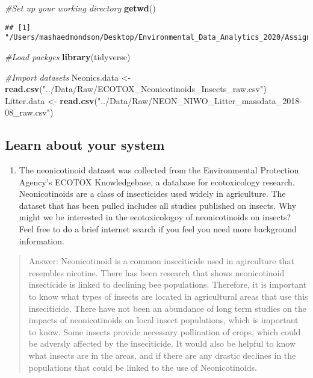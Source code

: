 \documentclass[]{article}
\newenvironment{Shaded}{\begin{snugshade}}{\end{snugshade}}
\newcommand{\CommentTok}[1]{\textcolor[rgb]{0.56,0.35,0.01}{\textit{#1}}}
\newcommand{\KeywordTok}[1]{\textcolor[rgb]{0.13,0.29,0.53}{\textbf{#1}}}
\newcommand{\NormalTok}[1]{#1}
\newcommand{\StringTok}[1]{\textcolor[rgb]{0.31,0.60,0.02}{#1}}
\providecommand{\tightlist}{%
  \setlength{\itemsep}{0pt}\setlength{\parskip}{0pt}}
\begin{document}
\begin{Shaded}
\begin{Highlighting}[]
\CommentTok{#Set up your working directory}
\KeywordTok{getwd}\NormalTok{()}
\end{Highlighting}
\end{Shaded}

\begin{verbatim}
## [1] "/Users/mashaedmondson/Desktop/Environmental_Data_Analytics_2020/Assignments"
\end{verbatim}

\begin{Shaded}
\begin{Highlighting}[]
\CommentTok{#Load packges}
\KeywordTok{library}\NormalTok{(tidyverse)}

\CommentTok{#Import datasets}
\NormalTok{Neonics.data <-}\StringTok{ }\KeywordTok{read.csv}\NormalTok{(}\StringTok{"../Data/Raw/ECOTOX_Neonicotinoids_Insects_raw.csv"}\NormalTok{)}
\NormalTok{Litter.data <-}\StringTok{ }\KeywordTok{read.csv}\NormalTok{(}\StringTok{"../Data/Raw/NEON_NIWO_Litter_massdata_2018-08_raw.csv"}\NormalTok{)}
\end{Highlighting}
\end{Shaded}

\hypertarget{learn-about-your-system}{%
\subsection{Learn about your system}\label{learn-about-your-system}}

\begin{enumerate}
\def\labelenumi{\arabic{enumi}.}
\setcounter{enumi}{1}
\tightlist
\item
  The neonicotinoid dataset was collected from the Environmental
  Protection Agency's ECOTOX Knowledgebase, a database for ecotoxicology
  research. Neonicotinoids are a class of insecticides used widely in
  agriculture. The dataset that has been pulled includes all studies
  published on insects. Why might we be interested in the ecotoxicologoy
  of neonicotinoids on insects? Feel free to do a brief internet search
  if you feel you need more background information.
\end{enumerate}

\begin{quote}
Answer: Neonicotinoid is a common inseciticide used in agirculture that
resembles nicotine. There has been research that shows neonicotinoid
insecticide is linked to declining bee populations. Therefore, it is
important to know what types of insects are located in agricultural
areas that use this inseciticide. There have not been an abundance of
long term studies on the impacts of neonicotinoids on local insect
populations, which is important to know. Some insects provide necessary
pollination of crops, which could be adversly affected by the
inseciticide. It would also be helpful to know what insects are in the
areas, and if there are any drastic declines in the populations that
could be linked to the use of Neonicotinoids.
\end{quote}
\end{document}
